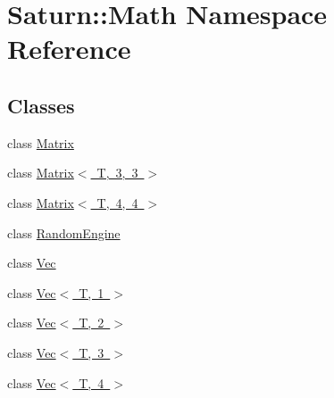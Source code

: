 \hypertarget{namespace_saturn_1_1_math}{}\section{Saturn\+:\+:Math Namespace Reference}
\label{namespace_saturn_1_1_math}
\subsection*{Classes}
\begin{DoxyCompactItemize}
\item 
class \mbox{\hyperlink{class_saturn_1_1_math_1_1_matrix}{Matrix}}
\item 
class \mbox{\hyperlink{class_saturn_1_1_math_1_1_matrix_3_01_t_00_013_00_013_01_4}{Matrix$<$ T, 3, 3 $>$}}
\item 
class \mbox{\hyperlink{class_saturn_1_1_math_1_1_matrix_3_01_t_00_014_00_014_01_4}{Matrix$<$ T, 4, 4 $>$}}
\item 
class \mbox{\hyperlink{class_saturn_1_1_math_1_1_random_engine}{Random\+Engine}}
\item 
class \mbox{\hyperlink{class_saturn_1_1_math_1_1_vec}{Vec}}
\item 
class \mbox{\hyperlink{class_saturn_1_1_math_1_1_vec_3_01_t_00_011_01_4}{Vec$<$ T, 1 $>$}}
\item 
class \mbox{\hyperlink{class_saturn_1_1_math_1_1_vec_3_01_t_00_012_01_4}{Vec$<$ T, 2 $>$}}
\item 
class \mbox{\hyperlink{class_saturn_1_1_math_1_1_vec_3_01_t_00_013_01_4}{Vec$<$ T, 3 $>$}}
\item 
class \mbox{\hyperlink{class_saturn_1_1_math_1_1_vec_3_01_t_00_014_01_4}{Vec$<$ T, 4 $>$}}
\end{DoxyCompactItemize}
